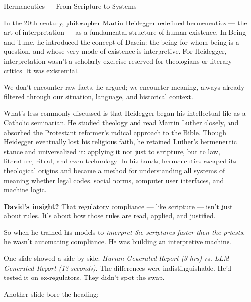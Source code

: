 \begin{PhilosophicalSidebar}{Hermeneutics --- From Scripture to Systems}
    \medskip
    
    In the 20th century, philosopher Martin Heidegger redefined hermeneutics — the art of interpretation — as a 
    fundamental structure of human existence. In Being and Time, he introduced the concept of Dasein: the being for 
    whom being is a question, and whose very mode of existence is interpretive. For Heidegger, interpretation wasn’t 
    a scholarly exercise reserved for theologians or literary critics. It was existential. 

    \medskip
    
    We don’t encounter raw facts, he argued; we encounter meaning, always already filtered through our situation, 
    language, and historical context. 

    \medskip
    
    What’s less commonly discussed is that Heidegger began his intellectual life as 
    a Catholic seminarian. He studied theology and read Martin Luther closely, and absorbed the Protestant reformer’s 
    radical approach to the Bible. Though Heidegger eventually lost his religious faith, he retained Luther’s hermeneutic 
    stance and universalized it: applying it not just to scripture, but to law, literature, ritual, and even technology. 
    In his hands, hermeneutics escaped its theological origins and became a method for understanding all systems of 
    meaning whether legal codes, social norms, computer user interfaces, and machine logic.
    
    \medskip
    
    \textbf{David’s insight?}  
    That regulatory compliance --- like scripture --- isn’t just about rules.  
    It’s about how those rules are read, applied, and justified.
    
    \medskip
    
    So when he trained his models to \textit{interpret the scriptures faster than the priests},  
    he wasn’t automating compliance.  
    He was building an interpretive machine.
    
\end{PhilosophicalSidebar}

\medskip


One slide showed a side-by-side:
\textit{Human-Generated Report (3 hrs)} vs. \textit{LLM-Generated Report (13 seconds)}.
The differences were indistinguishable. He’d tested it on ex-regulators. They didn’t spot the swap.

Another slide bore the heading:

